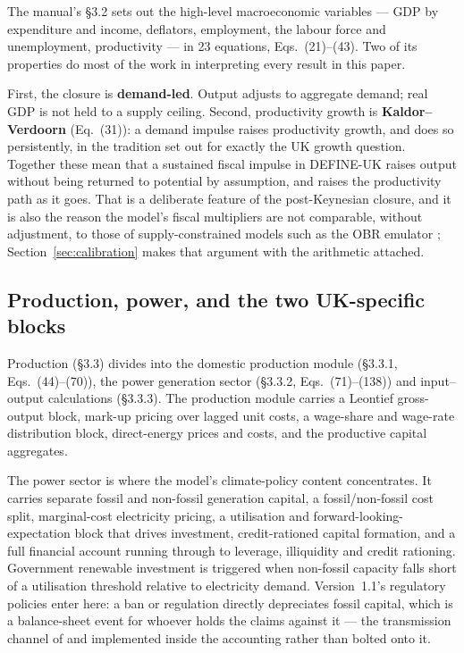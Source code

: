 The manual's \S3.2 sets out the high-level macroeconomic variables --- GDP by expenditure and income, deflators, employment, the labour force and unemployment, productivity --- in 23 equations, Eqs.~(21)--(43). Two of its properties do most of the work in interpreting every result in this paper.

First, the closure is \textbf{demand-led}. Output adjusts to aggregate demand; real GDP is not held to a supply ceiling. Second, productivity growth is \textbf{Kaldor--Verdoorn} (Eq.~(31)): a demand impulse raises productivity growth, and does so persistently, in the tradition \citet{kaldor1966} set out for exactly the UK growth question. Together these mean that a sustained fiscal impulse in DEFINE-UK raises output without being returned to potential by assumption, and raises the productivity path as it goes. That is a deliberate feature of the post-Keynesian closure, and it is also the reason the model's fiscal multipliers are not comparable, without adjustment, to those of supply-constrained models such as the OBR emulator \citep{ahmadi2026obr}; Section~\ref{sec:calibration} makes that argument with the arithmetic attached.

\subsection{Production, power, and the two UK-specific blocks}

Production (\S3.3) divides into the domestic production module (\S3.3.1, Eqs.~(44)--(70)), the power generation sector (\S3.3.2, Eqs.~(71)--(138)) and input--output calculations (\S3.3.3). The production module carries a Leontief gross-output block, mark-up pricing over lagged unit costs, a wage-share and wage-rate distribution block, direct-energy prices and costs, and the productive capital aggregates.

The power sector is where the model's climate-policy content concentrates. It carries separate fossil and non-fossil generation capital, a fossil/non-fossil cost split, marginal-cost electricity pricing, a utilisation and forward-looking-expectation block that drives investment, credit-rationed capital formation, and a full financial account running through to leverage, illiquidity and credit rationing. Government renewable investment is triggered when non-fossil capacity falls short of a utilisation threshold relative to electricity demand. Version~1.1's regulatory policies enter here: a ban or regulation directly depreciates fossil capital, which is a balance-sheet event for whoever holds the claims against it --- the transmission channel of \citet{carney2015} and \citet{battiston2017} implemented inside the accounting rather than bolted onto it.

